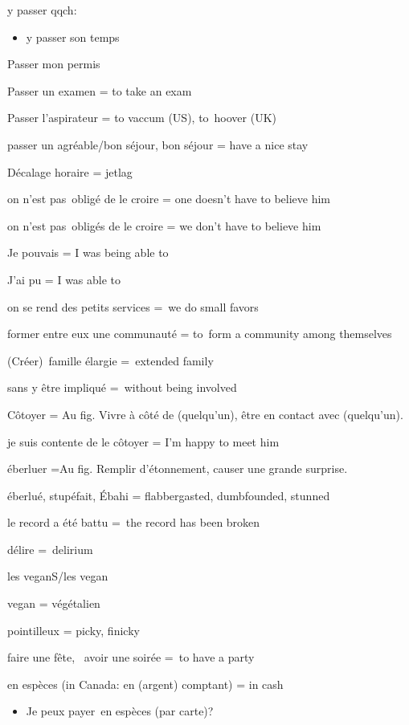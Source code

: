 {y passer} qqch:

\begin{itemize}
\item
  y passer son temps
\end{itemize}

{Passer mon permis~}

{Passer un examen = to take an exam}

{Passer l'aspirateur = to vaccum (US), to~hoover (UK)}

{passer un agréable/bon séjour, bon séjour = have a nice stay}

{D}{écalage horaire = jetlag}

{on n'est pas~}{obligé de le croire = one doesn't have to believe him}

{on n'est pas~}{obligés de le croire = we don't have to believe him}

{Je pouvais = I was being able to}

{J'ai pu = I was able to}

{on se rend des petits services =~}{we do small favors}

{former entre eux une communauté = to~}{form a community among
themselves}

{(Créer)~famille élargie =~}{extended family}

{sans y être impliqué =~}{without being involved}

{Côtoyer = Au fig. Vivre à côté de (quelqu'un), être en contact avec
(quelqu'un).}

{je suis contente de le côtoyer = I'm happy to meet him}

{éberluer =}{Au fig.} {Remplir d'étonnement, causer une grande
surprise.}

{éberlué, stupéfait, Ébahi = flabbergasted, dumbfounded}{, stunned}

{le record a été battu =~}{the record has been broken}

{délire =~}{delirium}

{les veganS/les vegan}

{vegan = v}{ég}{étalien}

{pointilleux = picky, finicky}

{faire une fête,~ avoir une soir}{ée =~}{to have a party}

{en espèces (in Canada: en (argent) comptant) = in cash}

\begin{itemize}
\item
  {Je peux payer~}{en espèces (par carte)?}
\end{itemize}

